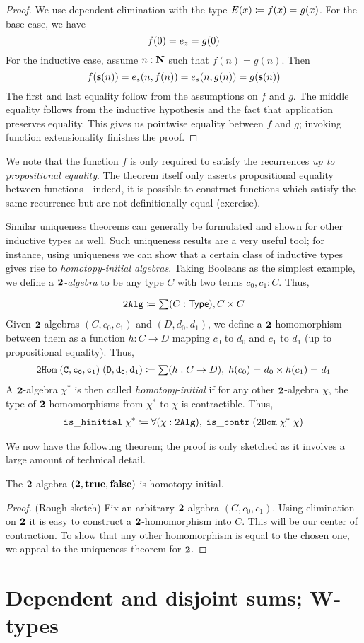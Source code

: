 \begin{proof}
We use dependent elimination with the type $E(x) \coloneqq f(x) =_{} g(x)$. For the base case, we have \[f(0) = e_z = g(0)\]
For the inductive case, assume $n : \mathbf{N}$ such that $f(n) = g(n)$. Then
\[ f(\mathbf{s}(n)) = e_s(n, f(n)) = e_s(n, g(n)) = g(\mathbf{s}(n)) \]
The first and last equality follow from the assumptions on $f$ and $g$. The middle equality follows from the inductive hypothesis and the fact that application preserves equality. This gives us pointwise equality between $f$ and $g$; invoking function extensionality finishes the proof.
\end{proof}
We note that the function $f$ is only required to satisfy the recurrences \emph{up to propositional equality}. The theorem itself only asserts propositional equality between functions - indeed, it is possible to construct functions which satisfy the same recurrence but are not definitionally equal (exercise). 

Similar uniqueness theorems can generally be formulated and shown for other inductive types as well. Such uniqueness results are a very useful tool; for instance, using uniqueness we can show that a certain class of inductive types gives rise to \emph{homotopy-initial algebras}. Taking Booleans as the simplest example, we define a \emph{$\mathbf{2}$-algebra} to be any type $C$ with two terms $c_0, c_1 : C$. Thus,

\begin{align*}
\mathtt{2Alg} \defeq \sm {C : \type} C \times C
\end{align*}
Given $\mathbf{2}$-algebras $(C,c_0,c_1)$ and $(D,d_0,d_1)$, we define a $\mathbf{2}$-homomorphism between them as a function $h : C \to D$ mapping $c_0$ to $d_0$ and
$c_1$ to $d_1$ (up to propositional equality). Thus,
\begin{align*}
\mathtt{2Hom \; (C,c_0,c_1) \; (D,d_0,d_1)} \defeq \sm {h : C \to D} \; \id{h(c_0)}{d_0} \times \id{h(c_1)}{d_1}
\end{align*}
A $\mathbf{2}$-algebra $\chi^*$ is then called \emph{homotopy-initial} if for any other $\mathbf{2}$-algebra $\chi$, the type of $\mathbf{2}$-homomorphisms from $\chi^*$ to $\chi$ is contractible. Thus,
\begin{align*}
\mathtt{is\_hinitial \; \chi^* \defeq \fall{\chi : 2Alg} \; is\_contr \; (2Hom \; \chi^*\; \chi)}
\end{align*}

We now have the following theorem; the proof is only sketched as it involves a large amount of technical detail.
\begin{thm}
The $\mathbf{2}$-algebra $(\mathbf{2}, \mathbf{true}, \mathbf{false})$ is homotopy initial.
\end{thm}
\begin{proof}
(Rough sketch) Fix an arbitrary $\mathbf{2}$-algebra $(C,c_0,c_1)$. Using elimination on $\mathbf{2}$ it is easy to construct a $\mathbf{2}$-homomorphism into $C$. This will be our
center of contraction. To show that any other homomorphism is equal to the chosen one, we appeal to the uniqueness theorem for $\mathbf{2}$.
\end{proof}

\section{Dependent and disjoint sums; W-types}